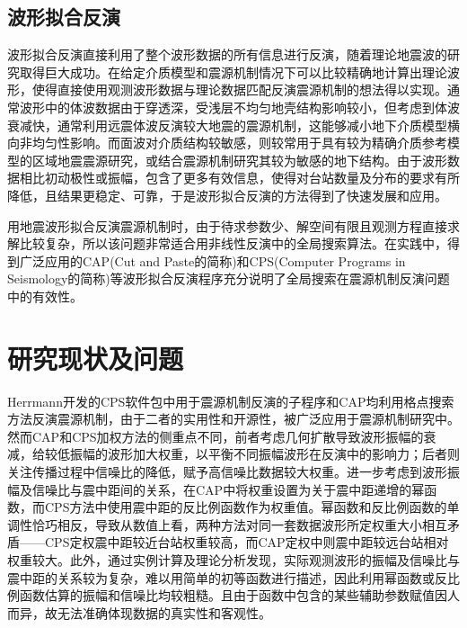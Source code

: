 \subsection{波形拟合反演}

波形拟合反演直接利用了整个波形数据的所有信息进行反演，随着理论地震波的研究取得巨大成功\citep{Haskell1964,Herrmann1979,Wang1980}。在给定介质模型和震源机制情况下可以比较精确地计算出理论波形，使得直接使用观测波形数据与理论数据匹配反演震源机制的想法得以实现。通常波形中的体波数据由于穿透深，受浅层不均匀地壳结构影响较小，但考虑到体波衰减快，通常利用远震体波反演较大地震的震源机制，这能够减小地下介质模型横向非均匀性影响。而面波对介质结构较敏感，则较常用于具有较为精确介质参考模型的区域地震震源研究，或结合震源机制研究其较为敏感的地下结构\citep{Nolet1990}。由于波形数据相比初动极性或振幅，包含了更多有效信息，使得对台站数量及分布的要求有所降低，且结果更稳定、可靠，于是波形拟合反演的方法得到了快速发展和应用\citep{Walter1993,Ritsema1993,Zhao1994,Nabvelek1995}。

用地震波形拟合反演震源机制时，由于待求参数少、解空间有限且观测方程直接求解比较复杂，所以该问题非常适合用非线性反演中的全局搜索算法。在实践中，得到广泛应用的CAP(Cut and Paste的简称)\citep{Zhao1994,Zhu1996,Tan2006}和CPS(Computer Programs in Seismology的简称)\citep{Herrmann1989}等波形拟合反演程序充分说明了全局搜索在震源机制反演问题中的有效性。

\section{研究现状及问题}

Herrmann开发的CPS软件包中用于震源机制反演的子程序和CAP均利用格点搜索方法反演震源机制，由于二者的实用性和开源性，被广泛应用于震源机制研究中。然而CAP和CPS加权方法的侧重点不同，前者考虑几何扩散导致波形振幅的衰减，给较低振幅的波形加大权重，以平衡不同振幅波形在反演中的影响力；后者则关注传播过程中信噪比的降低，赋予高信噪比数据较大权重。进一步考虑到波形振幅及信噪比与震中距间的关系，\citet{Zhu1996}在CAP中将权重设置为关于震中距递增的幂函数，而CPS方法中使用震中距的反比例函数作为权重值。幂函数和反比例函数的单调性恰巧相反，导致从数值上看，两种方法对同一套数据波形所定权重大小相互矛盾——CPS定权震中距较近台站权重较高，而CAP定权中则震中距较远台站相对权重较大。此外，通过实例计算及理论分析发现，实际观测波形的振幅及信噪比与震中距的关系较为复杂，难以用简单的初等函数进行描述，因此利用幂函数或反比例函数估算的振幅和信噪比均较粗糙。且由于函数中包含的某些辅助参数赋值因人而异，故无法准确体现数据的真实性和客观性。

